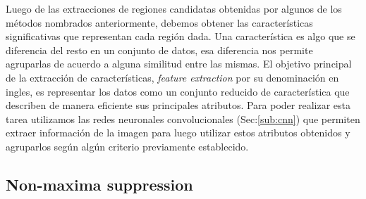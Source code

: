 Luego de las extracciones de regiones candidatas obtenidas por algunos de los métodos nombrados anteriormente, debemos obtener las características significativas que representan cada región dada. Una  característica es algo que se diferencia del resto en un conjunto de datos, esa diferencia nos permite agruparlas de acuerdo a alguna similitud entre las mismas. El objetivo principal de la  extracción de características, \textit{feature extraction} por su denominación en ingles, es representar los datos como un conjunto reducido de característica que describen de manera eficiente sus principales atributos. Para poder realizar esta tarea utilizamos  las redes neuronales convolucionales (Sec:\ref{sub:cnn}) que  permiten extraer información de la imagen para luego utilizar estos atributos obtenidos y agruparlos según algún criterio previamente establecido. 







\subsection{Non-maxima suppression}\label{sub:nonmaximumsuppression}

